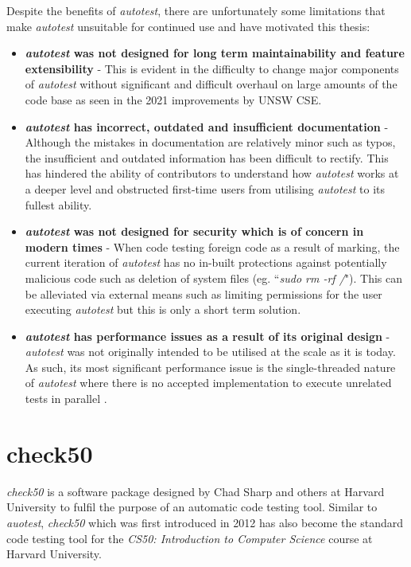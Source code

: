 \documentclass[hidelinks]{report}
\begin{document}
Despite the benefits of \textit{autotest}, there are unfortunately some limitations that make \textit{autotest} unsuitable for continued use and have motivated this thesis:
\begin{itemize}
	\item \textbf{\textit{autotest} was not designed for long term maintainability and feature extensibility} - This is evident in the difficulty to change major components of \textit{autotest} without significant and difficult overhaul on large amounts of the code base as seen in the 2021 improvements by UNSW CSE.
	\item \textbf{\textit{autotest} has incorrect, outdated and insufficient documentation} - Although the mistakes in documentation are relatively minor such as typos, the insufficient and outdated information has been difficult to rectify. This has hindered the ability of contributors to understand how \textit{autotest} works at a deeper level and obstructed first-time users from utilising \textit{autotest} to its fullest ability.
	\item \textbf{\textit{autotest} was not designed for security which is of concern in modern times} - When code testing foreign code as a result of marking, the current iteration of \textit{autotest} has no in-built protections against potentially malicious code such as deletion of system files (eg. ``\textit{sudo rm -rf /}"). This can be alleviated via external means such as limiting permissions for the user executing \textit{autotest} but this is only a short term solution.
	\item \textbf{\textit{autotest} has performance issues as a result of its original design} - \textit{autotest} was not originally intended to be utilised at the scale as it is today. As such, its most significant performance issue is the single-threaded nature of \textit{autotest} where there is no accepted implementation to execute unrelated tests in parallel \cite{AutotestParallelisation}.
\end{itemize}

\clearpage
\section{check50}

\textit{check50} is a software package designed by Chad Sharp and others at Harvard University to fulfil the purpose of an automatic code testing tool. Similar to \textit{auotest}, \textit{check50} which was first introduced in 2012 has also become the standard code testing tool for the \textit{CS50: Introduction to Computer Science} course at Harvard University.
\end{document}
